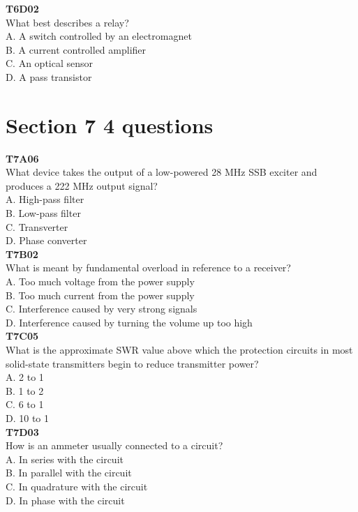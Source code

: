 \documentclass[12pt,letterpaper,twocolumn]{report}
\begin{document}
\textbf{T6D02}\\
What best describes a relay?\\
A. A switch controlled by an electromagnet\\
B. A current controlled amplifier\\
C. An optical sensor\\
D. A pass transistor\\

\section{Section 7 4 questions}

\textbf{T7A06}\\
What device takes the output of a low-powered 28 MHz SSB exciter and produces a 222 MHz output signal?\\
A. High-pass filter\\
B. Low-pass filter\\
C. Transverter\\
D. Phase converter\\

\textbf{T7B02}\\
What is meant by fundamental overload in reference to a receiver?\\
A. Too much voltage from the power supply\\
B. Too much current from the power supply\\
C. Interference caused by very strong signals\\
D. Interference caused by turning the volume up too high\\

\textbf{T7C05}\\
What is the approximate SWR value above which the protection circuits in most solid-state transmitters begin to reduce transmitter power?\\
A. 2 to 1\\
B. 1 to 2\\
C. 6 to 1\\
D. 10 to 1 \\

\textbf{T7D03}\\
How is an ammeter usually connected to a circuit?\\
A. In series with the circuit\\
B. In parallel with the circuit\\
C. In quadrature with the circuit\\
D. In phase with the circuit\\
\end{document}
